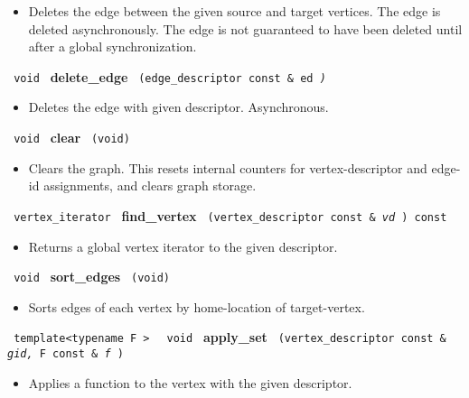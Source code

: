\begin{itemize}
\item
Deletes the edge between the given source and target vertices. The edge is deleted asynchronously. The edge is not guaranteed to have been deleted until after a global synchronization.
\end{itemize}

\noindent
\texttt{%
void
}
\newline
\textbf{%
 delete\_edge
}
\texttt{%
(edge\_descriptor const \&
ed
\textit{)}%
}

\begin{itemize}
\item
Deletes the edge with given descriptor. Asynchronous.
\end{itemize}

\noindent
\texttt{%
void
}
\newline
\textbf{clear}%
\texttt{%
(void)
}

\begin{itemize}
\item
Clears the graph. This resets internal counters for vertex-descriptor and edge-id assignments, and clears graph storage.
\end{itemize}

\noindent
\texttt{%
vertex\_iterator
}
\newline
\textbf{find\_vertex}%
\texttt{%
(vertex\_descriptor const \&
\textit{vd}%
) const
}

\begin{itemize}
\item
Returns a global vertex iterator to the given descriptor.
\end{itemize}

\noindent
\texttt{%
void
}
\newline
\textbf{sort\_edges}%
\texttt{%
(void)
}

\begin{itemize}
\item
Sorts edges of each vertex by home-location of target-vertex.
\end{itemize}

\noindent
\texttt{%
template<typename F >
}
\texttt{%
void
}
\newline
\textbf{apply\_set}%
\texttt{%
(vertex\_descriptor const \&
\textit{gid,}%
F const \&
\textit{f}%
)
}

\begin{itemize}
\item
Applies a function to the vertex with the given descriptor.
\end{itemize}

